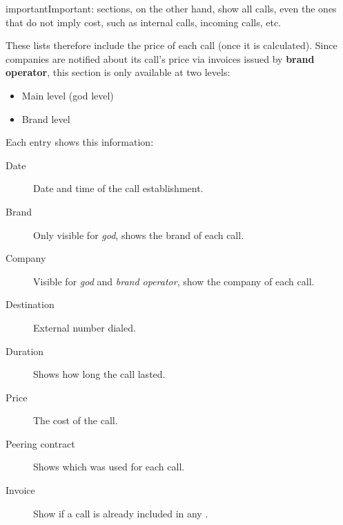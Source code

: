 \documentclass[letterpaper,10pt,english]{sphinxmanual}
\begin{document}
\begin{notice}{important}{Important:}
{\hyperref[company/call_registry:call\string-registry]{}} sections, on the other hand, show all calls,
even the ones that do not imply cost, such as internal calls, incoming calls,
etc.
\end{notice}

These lists therefore include the price of each call (once it is calculated). Since
companies are notified about its call's price via invoices issued by \textbf{brand operator},
this section is only available at two levels:
\begin{itemize}
\item {} 
Main level (god level)

\item {} 
Brand level

\end{itemize}

Each entry shows this information:
\begin{description}
\item[{Date}] \leavevmode{}\label{brand/billing/billable_calls:term-date}
Date and time of the call establishment.

\item[{Brand}] \leavevmode{}\label{brand/billing/billable_calls:term-brand}
Only visible for \emph{god}, shows the brand of each call.

\item[{Company}] \leavevmode{}\label{brand/billing/billable_calls:term-company}
Visible for \emph{god} and \emph{brand operator}, show the company of each call.

\item[{Destination}] \leavevmode{}\label{brand/billing/billable_calls:term-destination}
External number dialed.

\item[{Duration}] \leavevmode{}\label{brand/billing/billable_calls:term-duration}
Shows how long the call lasted.

\item[{Price}] \leavevmode{}\label{brand/billing/billable_calls:term-price}
The cost of the call.

\item[{Peering contract}] \leavevmode{}\label{brand/billing/billable_calls:term-peering-contract}
Shows which {\hyperref[brand/peering/peering_contracts:peering\string-contracts]{}} was used for
each call.

\item[{Invoice}] \leavevmode{}\label{brand/billing/billable_calls:term-invoice}
Show if a call is already included in any {\hyperref[brand/invoices/invoices:invoices]{}}.

\end{description}
\end{document}
